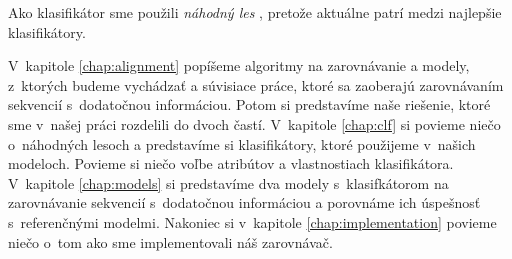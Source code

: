 

Ako klasifikátor sme použili \emph{náhodný les} \cite{randomForestPaper}, pretože aktuálne patrí medzi najlepšie klasifikátory.


V~kapitole \ref{chap:alignment} popíšeme algoritmy na zarovnávanie a modely, z~ktorých budeme vychádzať a súvisiace práce, ktoré sa zaoberajú zarovnávaním sekvencií s~dodatočnou informáciou. Potom si predstavíme naše riešenie, ktoré sme v~našej práci rozdelili do dvoch častí. V~kapitole \ref{chap:clf} si povieme niečo o~náhodných lesoch a predstavíme si klasifikátory, ktoré použijeme v~našich modeloch. Povieme si niečo voľbe atribútov a vlastnostiach klasifikátora. V~kapitole \ref{chap:models} si predstavíme dva modely s~klasifkátorom na zarovnávanie sekvencií s~dodatočnou informáciou a porovnáme ich úspešnosť s~referenčnými modelmi. Nakoniec si v~kapitole \ref{chap:implementation} povieme niečo o~tom ako sme implementovali náš zarovnávač.
